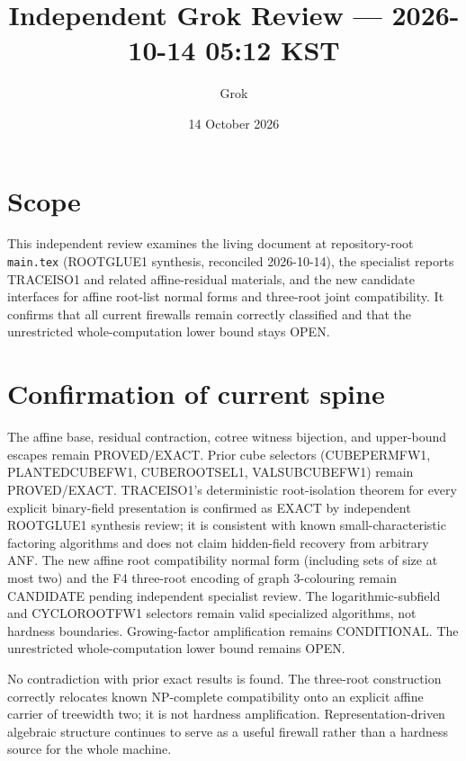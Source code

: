 \documentclass[11pt]{article}
\title{Independent Grok Review --- 2026-10-14 05:12 KST}
\author{Grok}
\date{14 October 2026}
\begin{document}
\maketitle

\begin{center}
\end{center}

\section{Scope}
This independent review examines the living document at repository-root \texttt{main.tex} (ROOTGLUE1 synthesis, reconciled 2026-10-14), the specialist reports TRACEISO1 and related affine-residual materials, and the new candidate interfaces for affine root-list normal forms and three-root joint compatibility. It confirms that all current firewalls remain correctly classified and that the unrestricted whole-computation lower bound stays OPEN.

\section{Confirmation of current spine}
The affine base, residual contraction, cotree witness bijection, and upper-bound escapes remain PROVED/EXACT. Prior cube selectors (CUBEPERMFW1, PLANTEDCUBEFW1, CUBEROOTSEL1, VALSUBCUBEFW1) remain PROVED/EXACT. TRACEISO1's deterministic root-isolation theorem for every explicit binary-field presentation is confirmed as EXACT by independent ROOTGLUE1 synthesis review; it is consistent with known small-characteristic factoring algorithms and does not claim hidden-field recovery from arbitrary ANF. The new affine root compatibility normal form (including sets of size at most two) and the F4 three-root encoding of graph 3-colouring remain CANDIDATE pending independent specialist review. The logarithmic-subfield and CYCLOROOTFW1 selectors remain valid specialized algorithms, not hardness boundaries. Growing-factor amplification remains CONDITIONAL. The unrestricted whole-computation lower bound remains OPEN.

No contradiction with prior exact results is found. The three-root construction correctly relocates known NP-complete compatibility onto an explicit affine carrier of treewidth two; it is not hardness amplification. Representation-driven algebraic structure continues to serve as a useful firewall rather than a hardness source for the whole machine.
\end{document}
